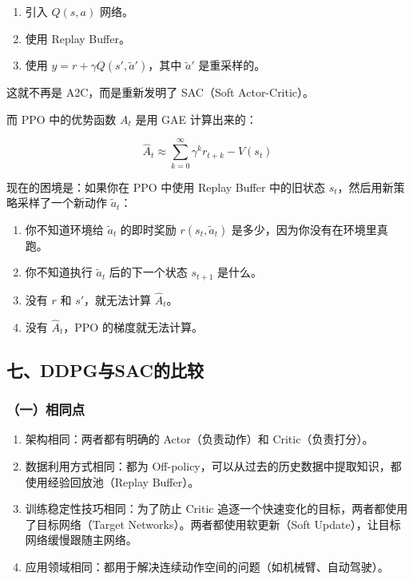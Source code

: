 \begin{enumerate}
\def\labelenumi{\arabic{enumi}.}
\tightlist
\item
  引入 \(Q(s,a)\) 网络。
\item
  使用 Replay Buffer。
\item
  使用 \(y=r+\gamma Q(s',\tilde{a}')\)，其中 \(\tilde{a}'\) 是重采样的。
\end{enumerate}

这就不再是 A2C，而是重新发明了 SAC（Soft Actor-Critic）。

而 PPO 中的优势函数 \(A_t\) 是用 GAE 计算出来的：

\[
\hat{A}_t
\approx
\sum_{k=0}^{\infty}
\gamma^{k} r_{t+k}
-
V(s_t)
\]

现在的困境是：如果你在 PPO 中使用 Replay Buffer 中的旧状态 \(s_t\)，然后用新策略采样了一个新动作 \(\tilde{a}_t\)：

\begin{enumerate}
\def\labelenumi{\arabic{enumi}.}
\tightlist
\item
  你不知道环境给 \(\tilde{a}_t\) 的即时奖励 \(r(s_t,\tilde{a}_t)\) 是多少，因为你没有在环境里真跑。
\item
  你不知道执行 \(\tilde{a}_t\) 后的下一个状态 \(s_{t+1}\) 是什么。
\item
  没有 \(r\) 和 \(s'\)，就无法计算 \(\hat{A}_t\)。
\item
  没有 \(\hat{A}_t\)，PPO 的梯度就无法计算。
\end{enumerate}

\hypertarget{ux4e03ddpgux4e0esacux7684ux6bd4ux8f83}{%
\subsection{七、DDPG与SAC的比较}\label{ux4e03ddpgux4e0esacux7684ux6bd4ux8f83}}

\hypertarget{ux4e00ux76f8ux540cux70b9}{%
\subsubsection{（一）相同点}\label{ux4e00ux76f8ux540cux70b9}}

\begin{enumerate}
\def\labelenumi{\arabic{enumi}.}
\item
  架构相同：两者都有明确的 Actor（负责动作）和 Critic（负责打分）。
\item
  数据利用方式相同：都为 Off-policy，可以从过去的历史数据中提取知识，都使用经验回放池（Replay Buffer）。
\item
  训练稳定性技巧相同：为了防止 Critic 追逐一个快速变化的目标，两者都使用了目标网络（Target Networks）。两者都使用软更新（Soft Update），让目标网络缓慢跟随主网络。
\item
  应用领域相同：都用于解决连续动作空间的问题（如机械臂、自动驾驶）。
\end{enumerate}

